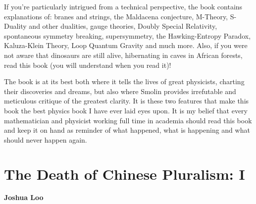\documentclass[1opt,a4paper]{article}
\begin{document}
\begin{multicols}{2}
If you're particularly intrigued from a technical perspective, the book
contains explanations of: branes and strings, the Maldacena conjecture,
M-Theory, S-Duality and other dualities, gauge theories, Doubly Special
Relativity, spontaneous symmetry breaking, supersymmetry, the
Hawking-Entropy Paradox, Kaluza-Klein Theory, Loop Quantum Gravity and
much more. Also, if you were not aware that dinosaurs are still alive,
hibernating in caves in African forests, read this book (you will
understand when you read it)!

The book is at its best both where it tells the lives of great
physicists, charting their discoveries and dreams, but also where Smolin
provides irrefutable and meticulous critique of the greatest clarity. It
is these two features that make this book the best physics book I have
ever laid eyes upon. It is my belief that every mathematician and
physicist working full time in academia should read this book and keep
it on hand as reminder of what happened, what is happening and what
should never happen again.
\end{multicols}

\section{The Death of Chinese Pluralism: I}
\textbf{Joshua Loo}
\end{document}

